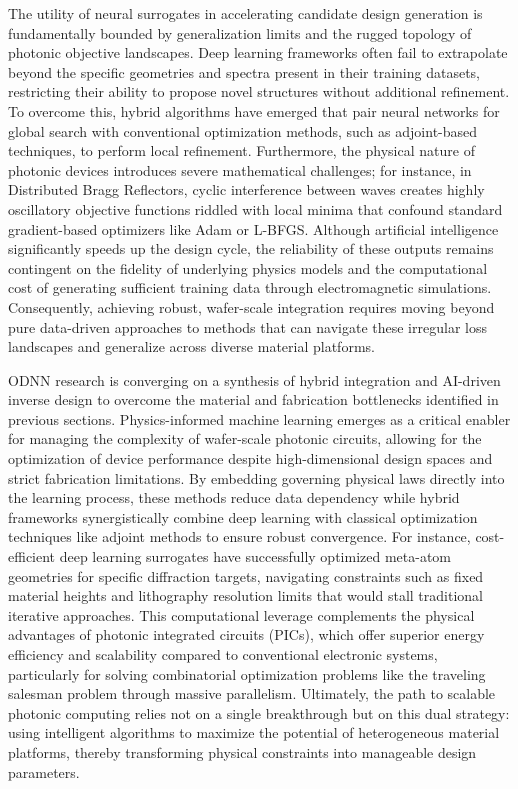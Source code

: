 The utility of neural surrogates in accelerating candidate design generation is fundamentally bounded by generalization limits and the rugged topology of photonic objective landscapes. Deep learning frameworks often fail to extrapolate beyond the specific geometries and spectra present in their training datasets, restricting their ability to propose novel structures without additional refinement. To overcome this, hybrid algorithms have emerged that pair neural networks for global search with conventional optimization methods, such as adjoint-based techniques, to perform local refinement. Furthermore, the physical nature of photonic devices introduces severe mathematical challenges; for instance, in Distributed Bragg Reflectors, cyclic interference between waves creates highly oscillatory objective functions riddled with local minima that confound standard gradient-based optimizers like Adam or L-BFGS. Although artificial intelligence significantly speeds up the design cycle, the reliability of these outputs remains contingent on the fidelity of underlying physics models and the computational cost of generating sufficient training data through electromagnetic simulations. Consequently, achieving robust, wafer-scale integration requires moving beyond pure data-driven approaches to methods that can navigate these irregular loss landscapes and generalize across diverse material platforms. \citep{doi_10_1021_acsphotonics_2c00968_06a2e96b} \citep{doi_10_48550_arxiv_2602_18148_e9c0a72b} \citep{doi_10_1515_nanoph_2024_0536_4b6631ba}

ODNN research is converging on a synthesis of hybrid integration and AI-driven inverse design to overcome the material and fabrication bottlenecks identified in previous sections. Physics-informed machine learning emerges as a critical enabler for managing the complexity of wafer-scale photonic circuits, allowing for the optimization of device performance despite high-dimensional design spaces and strict fabrication limitations. By embedding governing physical laws directly into the learning process, these methods reduce data dependency while hybrid frameworks synergistically combine deep learning with classical optimization techniques like adjoint methods to ensure robust convergence. For instance, cost-efficient deep learning surrogates have successfully optimized meta-atom geometries for specific diffraction targets, navigating constraints such as fixed material heights and lithography resolution limits that would stall traditional iterative approaches. This computational leverage complements the physical advantages of photonic integrated circuits (PICs), which offer superior energy efficiency and scalability compared to conventional electronic systems, particularly for solving combinatorial optimization problems like the traveling salesman problem through massive parallelism. Ultimately, the path to scalable photonic computing relies not on a single breakthrough but on this dual strategy: using intelligent algorithms to maximize the potential of heterogeneous material platforms, thereby transforming physical constraints into manageable design parameters. \citep{doi_10_1109_sbfotoniopc62248_2024_10813471_692f0088} \citep{doi_10_1021_acsami_5c03196_32a62b73} \citep{doi_10_3390_nano14080697_c372a140}

